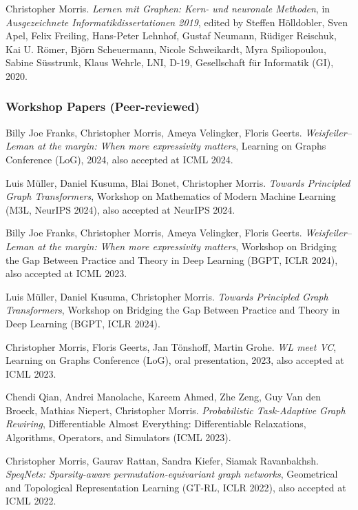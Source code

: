 \documentclass[11pt, a4paper, DIV=14, headings=small]{scrartcl}
\begin{document}
\begin{thebibliography}{15}
		Christopher Morris.
		\emph{Lernen mit Graphen: Kern- und neuronale Methoden}, in
		\emph{Ausgezeichnete Informatikdissertationen 2019}, edited by Steffen H{\"o}lldobler, Sven Apel, Felix Freiling, Hans-Peter Lehnhof, Gustaf Neumann, R{\"u}diger Reischuk, Kai U. R{\"o}mer, Bj{\"o}rn Scheuermann, Nicole Schweikardt, Myra Spiliopoulou, Sabine S{\"u}sstrunk, Klaus Wehrle, LNI, D-19, Gesellschaft f{\"u}r Informatik (GI), 2020.
		
		\subsubsection*{Workshop Papers (Peer-reviewed)}
		Billy Joe Franks, Christopher Morris, Ameya 	Velingker, Floris Geerts.
		\emph{Weisfeiler–Leman at the margin: When more expressivity matters},
		Learning on Graphs Conference (LoG), 2024, also accepted at ICML 2024.
		
		Luis Müller, Daniel Kusuma, Blai Bonet, Christopher Morris.
		\emph{Towards Principled Graph Transformers},
		Workshop on Mathematics of Modern Machine Learning (M3L, NeurIPS 2024), also accepted at NeurIPS 2024.
		
Billy Joe Franks, Christopher Morris, Ameya 	Velingker, Floris Geerts.
\emph{Weisfeiler–Leman at the margin: When more expressivity matters},
Workshop on Bridging the Gap Between Practice and   Theory in Deep Learning (BGPT, ICLR 2024), also accepted at ICML 2023.

		Luis Müller, Daniel Kusuma, Christopher Morris.
		\emph{Towards Principled Graph Transformers},
		Workshop on Bridging the Gap Between Practice and   Theory in Deep Learning (BGPT, ICLR 2024).
		
		
		Christopher Morris, Floris Geerts, Jan Tönshoff, Martin Grohe.
		\emph{WL meet VC},
		Learning on Graphs Conference  (LoG), oral presentation, 2023, also accepted at ICML 2023.
						
		Chendi Qian, Andrei Manolache, Kareem Ahmed, Zhe Zeng, Guy Van den Broeck, Mathias Niepert, Christopher Morris.
		\emph{Probabilistic Task-Adaptive Graph Rewiring}, Differentiable Almost Everything: Differentiable Relaxations, Algorithms, Operators, and Simulators (ICML 2023).

		
		Christopher Morris, Gaurav Rattan, Sandra Kiefer, Siamak Ravanbakhsh.
		\emph{SpeqNets: Sparsity-aware permutation-equivariant graph networks},
		Geometrical and Topological Representation Learning (GT-RL, ICLR 2022), also accepted at ICML 2022.
		

\end{thebibliography}
\end{document}
